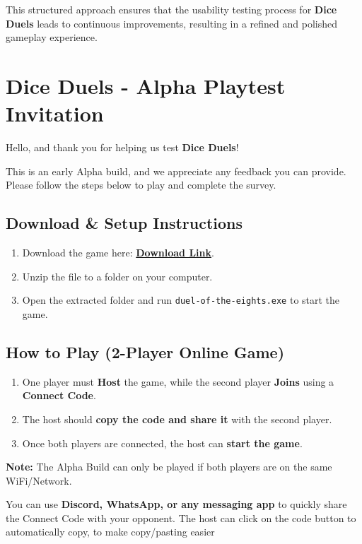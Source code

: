 \documentclass[12pt, titlepage]{article}
\begin{document}
This structured approach ensures that the usability testing process for \textbf{Dice Duels} leads to continuous improvements, resulting in a refined and polished gameplay experience.

\newpage

\section{Dice Duels - Alpha Playtest Invitation}

Hello, and thank you for helping us test \textbf{Dice Duels}!

This is an early Alpha build, and we appreciate any feedback you can provide. Please follow the steps below to play and complete the survey.

\subsection{Download \& Setup Instructions}
\begin{enumerate}
    \item Download the game here: \href{https://drive.google.com/file/d/1eDyBru4fAjn-ErjmaTQIKcBtgJJSfgcL/view?usp=sharing}{\textbf{Download Link}}.
    \item Unzip the file to a folder on your computer.
    \item Open the extracted folder and run \texttt{duel-of-the-eights.exe} to start the game.
\end{enumerate}

\subsection{How to Play (2-Player Online Game)}
\begin{enumerate}
    \item One player must \textbf{Host} the game, while the second player \textbf{Joins} using a \textbf{Connect Code}.
    \item The host should \textbf{copy the code and share it} with the second player.
    \item Once both players are connected, the host can \textbf{start the game}.
\end{enumerate}

\textbf{Note:} The Alpha Build can only be played if both players are on the same WiFi/Network.

\begin{tcolorbox}[colback=gray!10, colframe=black, title=Tip]
You can use \textbf{Discord, WhatsApp, or any messaging app} to quickly share the Connect Code with your opponent.
The host can click on the code button to automatically copy, to make copy/pasting easier
\end{tcolorbox}
\end{document}
